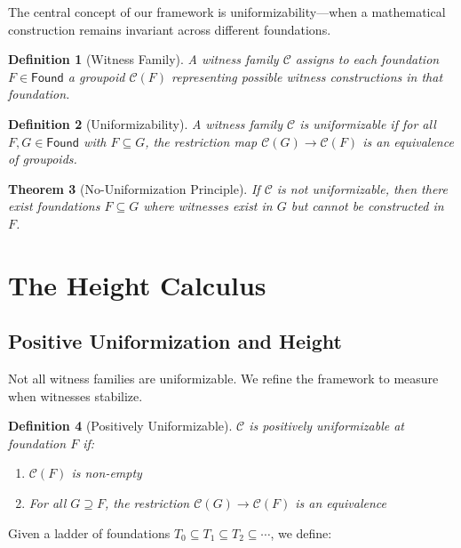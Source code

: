 \documentclass[11pt]{article}
\newtheorem{theorem}{Theorem}[section]
\newtheorem{definition}[theorem]{Definition}
\newcommand{\Found}{\mathsf{Found}}
\begin{document}
The central concept of our framework is uniformizability—when a mathematical construction remains invariant across different foundations.

\begin{definition}[Witness Family]
A \emph{witness family} $\mathcal{C}$ assigns to each foundation $F \in \Found$ a groupoid $\mathcal{C}(F)$ representing possible witness constructions in that foundation.
\end{definition}

\begin{definition}[Uniformizability]
A witness family $\mathcal{C}$ is \emph{uniformizable} if for all $F, G \in \Found$ with $F \subseteq G$, the restriction map $\mathcal{C}(G) \to \mathcal{C}(F)$ is an equivalence of groupoids.
\end{definition}

\begin{theorem}[No-Uniformization Principle]\label{thm:no-unif}
If $\mathcal{C}$ is not uniformizable, then there exist foundations $F \subseteq G$ where witnesses exist in $G$ but cannot be constructed in $F$.
\end{theorem}

\section{The Height Calculus}

\subsection{Positive Uniformization and Height}

Not all witness families are uniformizable. We refine the framework to measure when witnesses stabilize.

\begin{definition}[Positively Uniformizable]
$\mathcal{C}$ is \emph{positively uniformizable} at foundation $F$ if:
\begin{enumerate}
\item $\mathcal{C}(F)$ is non-empty
\item For all $G \supseteq F$, the restriction $\mathcal{C}(G) \to \mathcal{C}(F)$ is an equivalence
\end{enumerate}
\end{definition}

Given a ladder of foundations $T_0 \subseteq T_1 \subseteq T_2 \subseteq \cdots$, we define:
\end{document}
